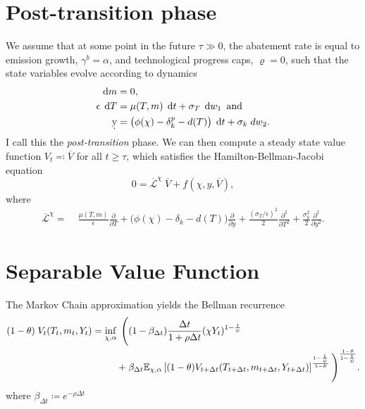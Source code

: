 \documentclass[../../main.tex]{subfiles}
\begin{document}
\section{Post-transition phase}

We assume that at some point in the future $\tau \gg 0$, the abatement rate is equal to emission growth, $\gamma^b = \alpha$, and technological progress caps, $\varrho = 0$, such that the state variables evolve according to dynamics \begin{align}
    \dd{m} &= 0, \\
    \epsilon \; \dd{T} &= \mu(T, m) \; \dd{t} + \sigma_T \; \dd{w_1} \text{ and } \\
    \d y &= \big( \phi(\chi) - \delta_k^p - d(T) \big) \; \dd{t} + \sigma_k \; d w_2.
\end{align} I call this the \textit{post-transition} phase. We can then compute a steady state value function $V_t \eqqcolon \overline{V}$ for all $t \geq \tau$, which satisfies the Hamilton-Bellman-Jacobi equation \begin{equation}
    0 = \overline{\mathcal{L}}^\chi \; \overline{V} + f(\chi, y, \overline{V}),
\end{equation} where \begin{equation}
    \begin{split}
        \overline{\mathcal{L}}^\chi = \; &\frac{\mu(T, m)}{\epsilon} \frac{\partial}{\partial T} + \Big(\phi(\chi) - \delta_k - d(T) \Big) \frac{\partial}{\partial y} + \frac{(\sigma_T / \epsilon)^2}{2} \frac{\partial^2}{\partial T^2} + \frac{\sigma^2_k}{2} \frac{\partial^2}{\partial y^2}.
    \end{split}
\end{equation}


\section{Separable Value Function}

The Markov Chain approximation yields the Bellman recurrence \begin{equation}
    \begin{split}
        (1 - \theta) \; V_{t}(T_t, m_t, Y_t) = \inf_{\chi, \alpha} \; \Bigg(&(1 - \beta_{\Delta t} )\frac{\Delta t}{1 + \rho \Delta t}  (\chi Y_t)^{1 - \frac{1}{\psi}} \\
        + \; &\beta_{\Delta t}  \mathbb{E}_{\chi, \alpha} \left[(1 - \theta)V_{t + \Delta t}(T_{t + \Delta t}, m_{t + \Delta t}, Y_{t + \Delta t})  \right]^{\frac{1 - \frac{1}{\psi}}{1 - \theta}} \Bigg)^{\frac{1 - \theta}{1 - \frac{1}{\psi}}}.
    \end{split}
\end{equation} where $\beta_{\Delta t} \coloneqq e^{-\rho \Delta t}$%
\end{document}
